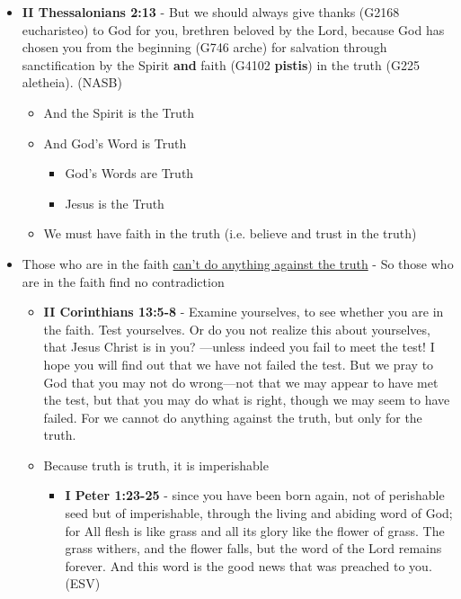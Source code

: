 \documentclass[11pt]{article}
\begin{document}
\begin{itemize}
\begin{itemize}
\begin{itemize}
\item \textbf{II Thessalonians 2:13} - But we should always give thanks (G2168 eucharisteo) to God for you, brethren beloved by the Lord, because God has chosen you from the beginning (G746 arche) for salvation through sanctification by the Spirit \textbf{and} faith (G4102 \textbf{pistis}) in the truth (G225 aletheia). (NASB)
\begin{itemize}
\item And the Spirit is the Truth
\item And God's Word is Truth
\begin{itemize}
\item God's Words are Truth
\item Jesus is the Truth
\end{itemize}
\item We must have faith in the truth (i.e. believe and trust in the truth)
\end{itemize}
\item Those who are in the faith \uline{can't do anything against the truth} - So those who are in the faith find no contradiction
\begin{itemize}
\item \textbf{II Corinthians 13:5-8} - Examine yourselves, to see whether you are in the faith. Test yourselves. Or do you not realize this about yourselves, that Jesus Christ is in you? —unless indeed you fail to meet the test! I hope you will find out that we have not failed the test. But we pray to God that you may not do wrong—not that we may appear to have met the test, but that you may do what is right, though we may seem to have failed. For we cannot do anything against the truth, but only for the truth.
\item Because truth is truth, it is imperishable
\begin{itemize}
\item \textbf{I Peter 1:23-25} - since you have been born again, not of perishable seed but of imperishable, through the living and abiding word of God; for All flesh is like grass and all its glory like the flower of grass. The grass withers, and the flower falls, but the word of the Lord remains forever. And this word is the good news that was preached to you. (ESV)

\end{itemize}
\end{itemize}
\end{itemize}
\end{itemize}
\end{itemize}
\end{document}
